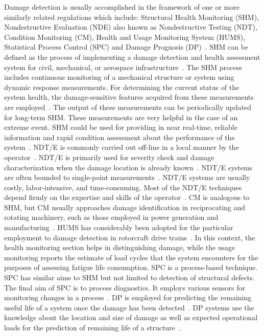\documentclass[b5paper, 11pt, titlepage]{book}
\begin{document}
Damage detection is usually accomplished in the framework of one or more similarly related regulations which include: Structural Health Monitoring (SHM), Nondestructive Evaluation (NDE) also known as Nondestructive Testing (NDT), Condition Monitoring (CM), Health and Usage Monitoring System (HUMS), Statistical Process Control (SPC) and Damage Prognosis (DP)~\cite{Farrar2007, Farrar2012}. SHM can be defined as the process of implementing a damage detection and health assessment system for civil, mechanical, or aerospace  infrastructure~\cite{Farrar2007, Farrar2012}. The SHM process includes continuous monitoring of a mechanical structure or system using dynamic response measurements. For determining the current status of the system health, the damage-sensitive features acquired from these measurements are employed~\cite{Farrar2007, Farrar2012}. The output of these measurements can be periodically updated for long-term SHM. These measurements are very helpful in the case of an extreme event. SHM could be used for providing in near real-time, reliable information and rapid condition assessment about the performance of the system~\cite{Farrar2012}. NDT/E is commonly carried out off-line in a local manner by the operator~\cite{stepinski2013advanced, shull2002nondestructive}. NDT/E is primarily used for severity check and damage characterization when the damage location is already known~\cite{Farrar2007,Farrar2012}. NDT/E systems are often bounded to single-point measurements~\cite{stepinski2013advanced}. NDT/E systems are usually costly, labor-intensive, and time-consuming. Most of the NDT/E techniques depend firmly on the expertise and skills of the operator~\cite{jawaid2018structural}. CM is analogous to SHM, but CM usually approaches damage identification in reciprocating and rotating machinery, such as those employed in power generation and manufacturing~\cite{Worden2004}. HUMS has considerably been adopted for the particular employment to damage detection in rotorcraft drive trains~\cite{Samuel2005}. In this context, the health monitoring section helps in distinguishing damage, while the usage monitoring reports the estimate of load cycles that the system encounters for the purposes of assessing fatigue life consumption. SPC is a process-based technique. SPC has similar aims to SHM but not limited to detection of structural defects. The final aim of SPC is to process diagnostics. It employs various sensors for monitoring changes in a process~\cite{stepinski2013advanced, montgomery2009dmaic}. DP is employed for predicting the remaining useful life of a system once the damage has been detected~\cite{farrar2003damage, Farrar2007, Farrar2012}. DP systems use the knowledge about the location and size of damage as well as expected operational loads for the prediction of remaining life of a structure~\cite{stepinski2013advanced}. 
\end{document}
